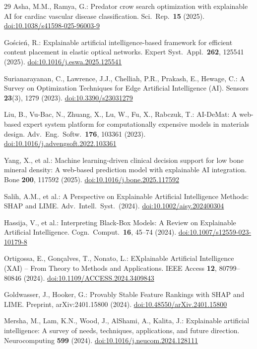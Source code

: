 \documentclass{svproc}
\begin{document}
\begin{thebibliography}{29}
Asha, M.M., Ramya, G.: Predator crow search optimization with explainable AI for cardiac vascular disease classification. Sci.\ Rep.\ \textbf{15} (2025). \url{doi:10.1038/s41598-025-96003-9}

Go\'{s}cie\'{n}, R.: Explainable artificial intelligence-based framework for efficient content placement in elastic optical networks. Expert Syst.\ Appl.\ \textbf{262}, 125541 (2025). \url{doi:10.1016/j.eswa.2025.125541}

Surianarayanan, C., Lawrence, J.J., Chelliah, P.R., Prakash, E., Hewage, C.: A Survey on Optimization Techniques for Edge Artificial Intelligence (AI). Sensors \textbf{23}(3), 1279 (2023). \url{doi:10.3390/s23031279}

Liu, B., Vu-Bac, N., Zhuang, X., Lu, W., Fu, X., Rabczuk, T.: AI-DeMat: A web-based expert system platform for computationally expensive models in materials design. Adv.\ Eng.\ Softw.\ \textbf{176}, 103361 (2023). \url{doi:10.1016/j.advengsoft.2022.103361}

Yang, X., et al.: Machine learning-driven clinical decision support for low bone mineral density: A web-based prediction model with explainable AI integration. Bone \textbf{200}, 117592 (2025). \url{doi:10.1016/j.bone.2025.117592}

Salih, A.M., et al.: A Perspective on Explainable Artificial Intelligence Methods: SHAP and LIME. Adv.\ Intell.\ Syst.\ (2024). \url{doi:10.1002/aisy.202400304}

Hassija, V., et al.: Interpreting Black-Box Models: A Review on Explainable Artificial Intelligence. Cogn.\ Comput.\ \textbf{16}, 45--74 (2024). \url{doi:10.1007/s12559-023-10179-8}

Ortigossa, E., Gon\c{c}alves, T., Nonato, L.: EXplainable Artificial Intelligence (XAI) -- From Theory to Methods and Applications. IEEE Access \textbf{12}, 80799--80846 (2024). \url{doi:10.1109/ACCESS.2024.3409843}

Goldwasser, J., Hooker, G.: Provably Stable Feature Rankings with SHAP and LIME. Preprint, arXiv:2401.15800 (2024). \url{doi:10.48550/arXiv.2401.15800}

Mersha, M., Lam, K.N., Wood, J., AlShami, A., Kalita, J.: Explainable artificial intelligence: A survey of needs, techniques, applications, and future direction. Neurocomputing \textbf{599} (2024). \url{doi:10.1016/j.neucom.2024.128111}


\end{thebibliography}
\end{document}
